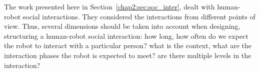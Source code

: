 \documentclass[a4paper,11pt,twoside]{StyleThese}
\begin{document}
\begin{comment}
In his thesis, Kuo criticizes Kahn’s work~\cite{kuo_2012_designing}. He says that these patterns involve sequences of interaction cues and should be decomposed to a lower level for detailed design and reuse. He proposed his own patterns:
\begin{bulletList}
	\item Human presence detection: detect when there is a person who might be interested in
	\item Showing interest for interaction: express the robot’s awareness of a user’s presence around it and its interest and willingness to interact
	\item User’s attention on the robot: Know when a user is paying attention to the robot in an interaction and its information on its screen
	\item User identification by face: Provides the fundamental block for personal service and social interaction by recognizing the human counterpart in an interaction
\end{bulletList}
He checked the validity of his patterns with the analysis of Problem statement, Context of Use, Interaction Modality, Combination with Other Patterns, Technical Performance and Limitations, User Feedback and User’s Perception, Resulting Interactive Behavior.

Finally, Peltason and Wrede also based their work on design patterns from computer science, specifically applied to dialogue here~\cite{peltason_2010_pamini}. To name a few of them: Simple action request, Interaction opening, Interaction closing, Clarification. During interaction, the registered patterns are employed in a flexible way by admitting that patterns can be interrupted by other patterns and possibly resumed later which leads to interleaving patterns. By default, simpler patterns are permitted to be nested within temporally extended patterns.

\end{comment}


\bigskip

The work presented here in Section~\ref{chap2:sec:soc_inter}, dealt with human-robot social interactions. They considered the interactions from different points of view. Thus, several dimensions should be taken into account when designing, structuring a human-robot social interaction: how long, how often do we expect the robot to interact with a particular person? what is the context, what are the interaction phases the robot is expected to meet? are there multiple levels in the interaction?
\end{document}

